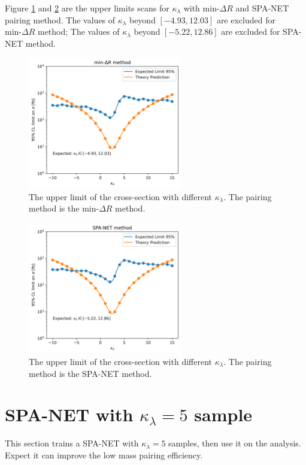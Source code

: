 \documentclass[12pt]{article}
\begin{document}
		Figure \ref{fig:CL_limit_kappa_min_dR} and \ref{fig:CL_limit_kappa_SPANET} are the upper limits scans for $\kappa_\lambda$ with $\text{min-}\Delta R$ and SPA-NET pairing method. The values of $\kappa_\lambda$ beyond $\left[ -4.93, 12.03 \right]$ are excluded for $\text{min-}\Delta R$ method; The values of $\kappa_\lambda$ beyond $\left[ -5.22, 12.86 \right]$ are excluded for SPA-NET method.
		\begin{figure}[htpb]
			\centering
			\includegraphics[width=0.6\textwidth]{CL_limit_kappa_min_dR.png}
			\caption{The upper limit of the cross-section with different $\kappa_\lambda$. The pairing method is the $\text{min-}\Delta R$ method.}
			\label{fig:CL_limit_kappa_min_dR}
		\end{figure}
		\begin{figure}[htpb]
			\centering
			\includegraphics[width=0.6\textwidth]{CL_limit_kappa_SPANET.png}
			\caption{The upper limit of the cross-section with different $\kappa_\lambda$. The pairing method is the SPA-NET method.}
			\label{fig:CL_limit_kappa_SPANET}
		\end{figure}

\section{SPA-NET with \texorpdfstring{$\kappa_\lambda=5$}{kappa=5} sample}%
\label{sec:spa_net_with_kappa_5_sample}
	This section trains a SPA-NET with $\kappa_\lambda=5$ samples, then use it on the analysis. Expect it can improve the low mass pairing efficiency.
\end{document}
